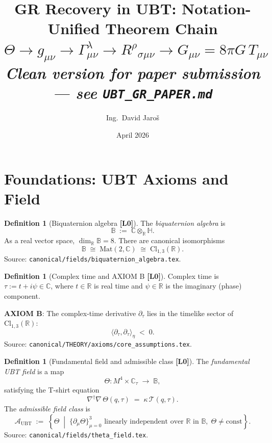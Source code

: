 \documentclass[12pt,a4paper]{article}
\title{\textbf{GR Recovery in UBT: Notation-Unified Theorem Chain}\\
  \large $\Theta \to g_{\mu\nu} \to \Gamma^\lambda_{\mu\nu}
         \to R^\rho{}_{\sigma\mu\nu} \to G_{\mu\nu} = 8\pi G\,T_{\mu\nu}$\\[4pt]
  \normalsize \textit{Clean version for paper submission — see \texttt{UBT\_GR\_PAPER.md}}}
\author{Ing.\ David Jaroš}
\date{April 2026}
\theoremstyle{definition}
\newtheorem{definition}[theorem]{Definition}
\theoremstyle{remark}
\newcommand{\Lzero}{\textbf{[L0]}}
\newcommand{\BB}{\mathbb{B}}               %
\newcommand{\AUBT}{\mathcal{A}_{\mathrm{UBT}}}  %
\begin{document}
\maketitle
\tableofcontents

\section{Foundations: UBT Axioms and Field}
\label{sec:foundations}

\begin{definition}[Biquaternion algebra \Lzero]
\label{def:biquaternion_algebra}
The \emph{biquaternion algebra} is
\[
  \BB \;:=\; \mathbb{C}\otimes_{\mathbb{R}}\mathbb{H}.
\]
As a real vector space, $\dim_{\mathbb{R}}\BB = 8$.  There are canonical isomorphisms
\[
  \BB \;\cong\; \mathrm{Mat}(2,\mathbb{C}) \;\cong\; \mathrm{Cl}_{1,3}(\mathbb{R}).
\]
Source: \texttt{canonical/fields/biquaternion\_algebra.tex}.
\end{definition}

\begin{definition}[Complex time and AXIOM B \Lzero]
\label{def:complex_time}
Complex time is $\tau := t + i\psi \in \mathbb{C}$, where $t \in \mathbb{R}$ is
real time and $\psi \in \mathbb{R}$ is the imaginary (phase) component.

\medskip
\textbf{AXIOM B}: The complex-time derivative $\partial_\tau$ lies in the timelike
sector of $\mathrm{Cl}_{1,3}(\mathbb{R})$:
\[
  \langle\partial_\tau, \partial_\tau\rangle_{\eta} \;<\; 0.
\]
Source: \texttt{canonical/THEORY/axioms/core\_assumptions.tex}.
\end{definition}

\begin{definition}[Fundamental field and admissible class \Lzero]
\label{def:theta_field}
The \emph{fundamental UBT field} is a map
\[
  \Theta : M^4 \times \mathbb{C}_\tau \;\longrightarrow\; \BB,
\]
satisfying the T-shirt equation
\[
  \nabla^\dagger\nabla\,\Theta(q,\tau) \;=\; \kappa\,\mathcal{T}(q,\tau).
\]
The \emph{admissible field class} is
\[
  \AUBT
  \;:=\; \left\{\Theta \;\middle|\;
     \{\partial_\mu\Theta\}_{\mu=0}^{3}\text{ linearly independent over }\mathbb{R}
     \text{ in }\BB,\;
     \Theta \neq \mathrm{const}\right\}.
\]
Source: \texttt{canonical/fields/theta\_field.tex}.
\end{definition}

\end{document}
